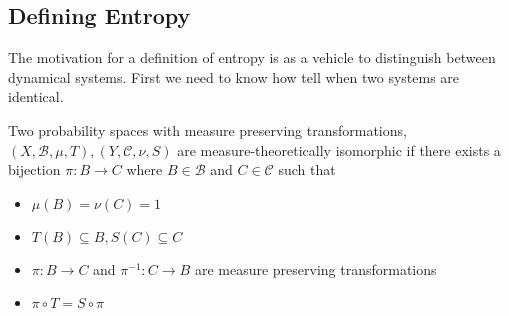 \documentclass[11pt]{article}
\newenvironment{defin}
	{\begin{mdframed}[backgroundcolor=white, roundcorner=5pt, linewidth=1pt]}
	{\end{mdframed}}
\newcommand{\mdf}[1]{{\color{red} #1}}
\begin{document}
\subsection{Defining Entropy}
The motivation for a definition of entropy is as a vehicle to distinguish between dynamical systems. First we need to know how tell when two systems are identical.
\begin{defin}
	Two probability spaces with measure preserving transformations, $(X,\mathcal{B},\mu,T),(Y,\mathcal{C}, \nu, S)$ are \mdf{measure-theoretically isomorphic} if there exists a bijection $\pi:B\to C$ where $B\in\mathcal{B}$ and $C\in\mathcal{C}$ such that
	\begin{itemize}
		\item $\mu(B)=\nu(C)=1$
		\item $T(B)\subseteq B, S(C)\subseteq C$
		\item $\pi: B\to C$ and $\pi^{-1}:C\to B$ are measure preserving transformations
		\item $\pi\circ T = S\circ\pi$
		\begin{figure}[H]
			\centering
		\end{figure}	
	\end{itemize}
	

\end{defin}
\end{document}

